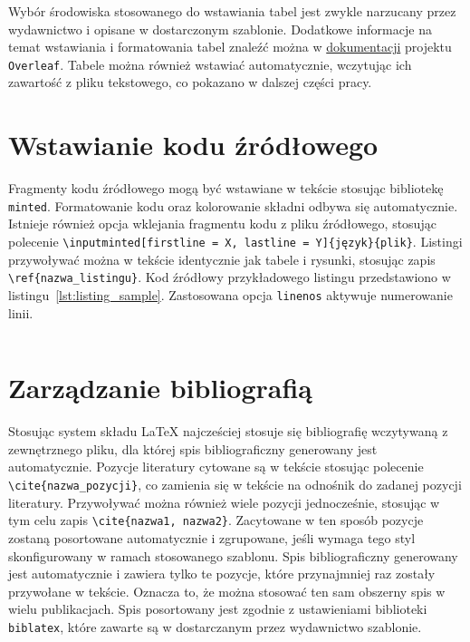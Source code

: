 Wybór środowiska stosowanego do wstawiania tabel jest zwykle narzucany przez wydawnictwo i opisane w dostarczonym szablonie. Dodatkowe informacje na temat wstawiania i formatowania tabel znaleźć można w \href{https://www.overleaf.com/learn/latex/Tables}{dokumentacji} projektu \texttt{Overleaf}. Tabele można również wstawiać automatycznie, wczytując ich zawartość z pliku tekstowego, co pokazano w dalszej części pracy.

\section{Wstawianie kodu źródłowego}

Fragmenty kodu źródłowego mogą być wstawiane w tekście stosując bibliotekę \texttt{minted}. Formatowanie kodu oraz kolorowanie składni odbywa się automatycznie. Istnieje również opcja wklejania fragmentu kodu z pliku źródłowego, stosując polecenie \verb|\inputminted[firstline = X, lastline = Y]{język}{plik}|. Listingi przywoływać można w tekście identycznie jak tabele i rysunki, stosując zapis \verb|\ref{nazwa_listingu}|. Kod źródłowy przykładowego listingu przedstawiono w listingu~\ref{lst:listing_sample}. Zastosowana opcja \texttt{linenos} aktywuje numerowanie linii.

\begin{listing}[htb]
\inputminted{latex}{skrypty/listing_sample.tex}
\end{listing}

\section{Zarządzanie bibliografią}

Stosując system składu \LaTeX{} najcześciej stosuje się bibliografię wczytywaną z zewnętrznego pliku, dla której spis bibliograficzny generowany jest automatycznie. Pozycje literatury cytowane są w tekście stosując polecenie \verb|\cite{nazwa_pozycji}|, co zamienia się w tekście na odnośnik do zadanej pozycji literatury. Przywoływać można również wiele pozycji jednocześnie, stosując w tym celu zapis \verb|\cite{nazwa1, nazwa2}|. Zacytowane w ten sposób pozycje zostaną posortowane automatycznie i zgrupowane, jeśli wymaga tego styl skonfigurowany w ramach stosowanego szablonu. Spis bibliograficzny generowany jest automatycznie i zawiera tylko te pozycje, które przynajmniej raz zostały przywołane w tekście. Oznacza to, że można stosować ten sam obszerny spis w wielu publikacjach. Spis posortowany jest zgodnie z ustawieniami biblioteki \texttt{biblatex}, które zawarte są w dostarczanym przez wydawnictwo szablonie.

